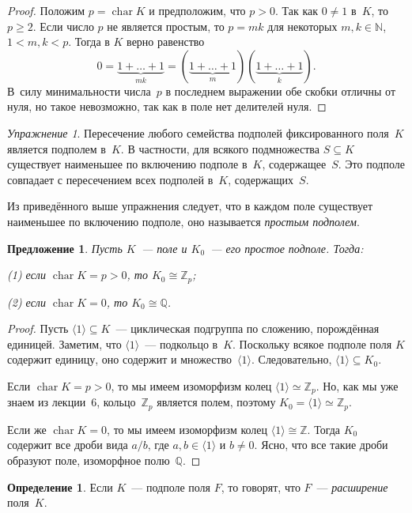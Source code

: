 \documentclass[a4paper,10pt]{amsart}
\newcommand{\xar}{\mathop{\mathrm{char}}}
\def\ZZ{{\mathbb Z}}%
\def\NN{{\mathbb N}}%
\def\QQ{{\mathbb Q}}%
\newtheorem{proposition}{Предложение}
\theoremstyle{definition}
\newtheorem{definition}{Определение}
\theoremstyle{remark}
\newtheorem{exercise}{Упражнение}
\begin{document}
\begin{proof}
Положим $p = \xar K$ и предположим, что $p > 0$. Так как $0 \ne 1$
в~$K$, то $p \geqslant 2$. Если число $p$ не является простым, то $p
= mk$ для некоторых $m,k \in \NN$, $1 < m,k < p$. Тогда в $K$ верно
равенство
$$
0 = \underbrace{1 + \ldots + 1}_{mk} = (\underbrace{1 + \ldots +
1}_m)(\underbrace{1 + \ldots + 1}_k).
$$
В~силу минимальности числа~$p$ в последнем выражении обе скобки
отличны от нуля, но такое невозможно, так как в поле нет делителей
нуля.
\end{proof}

\begin{exercise}
Пересечение любого семейства подполей фиксированного поля~$K$
является подполем в~$K$. В частности, для всякого подмножества $S
\subseteq K$ существует наименьшее по включению подполе в~$K$,
содержащее~$S$. Это подполе совпадает с пересечением всех подполей
в~$K$, содержащих~$S$.
\end{exercise}

Из приведённого выше упражнения следует, что в каждом поле
существует наименьшее по включению подполе, оно называется {\it
простым подполем}.

\begin{proposition}
Пусть $K$~--- поле и $K_0$~--- его простое подполе. Тогда:

\textup{(1)} если $\xar K = p > 0$, то $K_0 \cong \ZZ_p$;

\textup{(2)} если $\xar K = 0$, то $K_0 \cong \QQ$.
\end{proposition}

\begin{proof}
Пусть $\langle 1 \rangle \subseteq K$~--- циклическая подгруппа по
сложению, порождённая единицей. Заметим, что $\langle 1 \rangle$~---
подкольцо в~$K$. Поскольку всякое подполе поля $K$ содержит единицу,
оно содержит и множество~$\langle 1 \rangle$. Следовательно,
$\langle 1 \rangle \subseteq K_0$.

Если $\xar K = p > 0$, то мы имеем изоморфизм колец $\langle 1
\rangle \simeq \ZZ_p$. Но, как мы уже знаем из лекции~6,
кольцо~$\ZZ_p$ является полем, поэтому $K_0 = \langle 1 \rangle
\simeq \ZZ_p$.

Если же $\xar K = 0$, то мы имеем изоморфизм колец $\langle 1
\rangle \cong \ZZ$. Тогда $K_0$ содержит все дроби вида $a/b$, где
$a,b \in \langle 1 \rangle$ и $b \ne 0$. Ясно, что все такие дроби
образуют поле, изоморфное полю~$\QQ$.
\end{proof}

\begin{definition}
Если $K$~--- подполе поля $F$, то говорят, что $F$~--- {\it
расширение} поля~$K$.
\end{definition}
\end{document}
